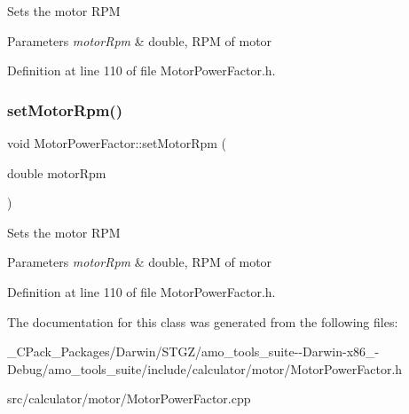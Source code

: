 Sets the motor R\+PM 
\begin{DoxyParams}{Parameters}
{\em motor\+Rpm} & double, R\+PM of motor \\
\hline
\end{DoxyParams}


Definition at line 110 of file Motor\+Power\+Factor.\+h.

\mbox{\label{class_motor_power_factor_a4154bf52c6c9c9e5fb2f0985d7ae3531}} 
\subsubsection{\texorpdfstring{set\+Motor\+Rpm()}{setMotorRpm()}\hspace{0.1cm}{\footnotesize\ttfamily [3/3]}}
{\footnotesize\ttfamily void Motor\+Power\+Factor\+::set\+Motor\+Rpm (\begin{DoxyParamCaption}\item[{double}]{motor\+Rpm }\end{DoxyParamCaption})\hspace{0.3cm}{\ttfamily [inline]}}

Sets the motor R\+PM 
\begin{DoxyParams}{Parameters}
{\em motor\+Rpm} & double, R\+PM of motor \\
\hline
\end{DoxyParams}


Definition at line 110 of file Motor\+Power\+Factor.\+h.



The documentation for this class was generated from the following files\+:\begin{DoxyCompactItemize}
\item 
\+\_\+\+C\+Pack\+\_\+\+Packages/\+Darwin/\+S\+T\+G\+Z/amo\+\_\+tools\+\_\+suite-\/-\/\+Darwin-\/x86\+\_-\/\+Debug/amo\+\_\+tools\+\_\+suite/include/calculator/motor/Motor\+Power\+Factor.\+h\item 
src/calculator/motor/Motor\+Power\+Factor.\+cpp\end{DoxyCompactItemize}
